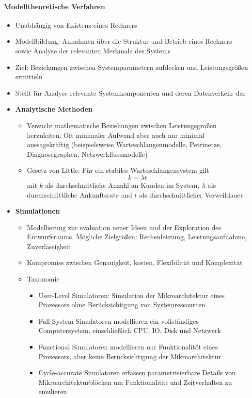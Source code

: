 	\paragraph{Modelltheoretische Verfahren}
		\begin{itemize}
		\item Unabhängig von Existenz eines Rechners
		\item Modellbildung: Annahmen über die Struktur und Betrieb eines Rechners sowie Analyse der relevanten Merkmale des Systems 
		\item Ziel: Beziehungen zwischen Systemparametern aufdecken und Leistungsgrößen ermitteln
		\item Stellt für Analyse relevante Systemkomponenten und deren Datenverkehr dar
		\item \textbf{Analytische Methoden}
			\begin{itemize}
				\item Versucht mathematische Beziehungen zwischen Leistungsgrößen herzuleiten. Oft minimaler Aufwand aber auch nur minimal aussagekräftig (beispielsweise Warteschlangenmodelle, Petrinetze, Diagnosegraphen, Netzwerkflussmodelle)
				\item Gesetz von Little: Für ein stabiles Warteschlangensystem gilt \[k=\lambda t\] mit $k$ als durchschnittliche Anzahl an Kunden im System, $\lambda$ als durchschnittliche Ankunftsrate und $t$ als durchschnittlicher Verweildauer.
			\end{itemize}
		\item \textbf{Simulationen}
			\begin{itemize}
				\item Modellierung zur evaluation neuer Ideen und der Exploration des Entwurfsraums. Mögliche Zielgrößen: Rechenleistung, Leistungsaufnahme, Zuverlässigkeit
				\item Kompromiss zwischen Genauigkeit, kosten, Flexibilität und Komplexität
				\item Taxonomie
				\begin{itemize}
					\item User-Level Simulatoren: Simulation der Mikroarchitektur eines Prozessors ohne Berücksichtigung von Systemressourcen
					\item Full-System Simulatoren modellieren ein vollständiges Computersystem, einschließlich CPU, IO, Disk und Netzwerk	
					\item Functional Simulatoren modellieren nur Funktionalitöt eines Prozessors, aber keine Berücksichtigung der Mikroarchitektur
					\item Cycle-accurate Simulatoren erfassen parametrisierbare Details von Mikroarchitekturblöcken um Funktionalität und Zeitverhalten zu emulieren

\end{itemize}
\end{itemize}
\end{itemize}

